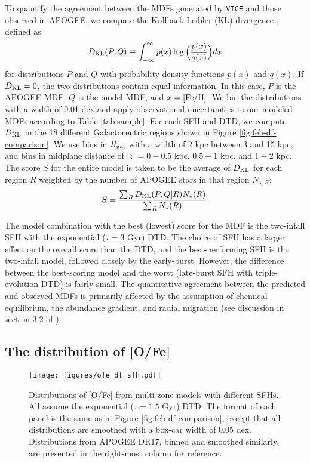 \documentclass[twocolumn,twocolappendix,linenumbers,trackchanges]{aastex631}
\newcommand{\vice}{{\tt VICE}\xspace}
\begin{document}
To quantify the agreement between the MDFs generated by \vice and those observed in APOGEE, we compute the Kullback-Leibler (KL) divergence \citep{KullbackLeibler1951}, defined as
\begin{equation}
    D_{\rm{KL}}(P,Q) \equiv \int_{-\infty}^{\infty} p(x) \log\Big(\frac{p(x)}{q(x)}\Big) dx
    \label{eq:kl-divergence}
\end{equation}
for distributions $P$ and $Q$ with probability density functions $p(x)$ and $q(x)$. If $D_{\rm KL}=0$, the two distributions contain equal information. In this case, $P$ is the APOGEE MDF, $Q$ is the model MDF, and $x={\rm [Fe/H]}$. We bin the distributions with a width of 0.01 dex and apply observational uncertainties to our modeled MDFs according to Table \ref{tab:sample}. For each SFH and DTD, we compute $D_{\rm{KL}}$ in the 18 different Galactocentric regions shown in Figure \ref{fig:feh-df-comparison}. We use bins in $R_{\rm gal}$ with a width of 2 kpc between 3 and 15 kpc, and bins in midplane distance of $|z|=0-0.5$ kpc, $0.5-1$ kpc, and $1-2$ kpc. The score $S$ for the entire model is taken to be the average of $D_{\rm{KL}}$ for each region $R$ weighted by the number of APOGEE stars in that region $N_{\star,R}$:
\begin{equation}
    S = \frac{\sum_R D_{\rm KL}(P,Q|R) N_\star(R)}{\sum_R N_\star(R)}.
    \label{eq:feh-df-score}
\end{equation}

The model combination with the best (lowest) score for the MDF is the two-infall SFH with the exponential ($\tau=3$ Gyr) DTD. The choice of SFH has a larger effect on the overall score than the DTD, and the best-performing SFH is the two-infall model, followed closely by the early-burst. However, the difference between the best-scoring model and the worst (late-burst SFH with triple-evolution DTD) is fairly small. The quantitative agreement between the predicted and observed MDFs is primarily affected by the assumption of chemical equilibrium, the abundance gradient, and radial migration (see discussion in section 3.2 of ).

\subsection{The distribution of [O/Fe]}
\label{sec:ofe-df}

\begin{figure*}
    \centering
    \texttt{[image: figures/ofe\_df\_sfh.pdf]}
    \caption{Distributions of [O/Fe] from multi-zone models with different SFHs. All assume the exponential ($\tau=1.5$ Gyr) DTD. The format of each panel is the same as in Figure \ref{fig:feh-df-comparison}, except that all distributions are smoothed with a box-car width of 0.05 dex. Distributions from APOGEE DR17, binned and smoothed similarly, are presented in the right-most column for reference.}
    \label{fig:ofe-df-sfh}
\end{figure*}
\end{document}
